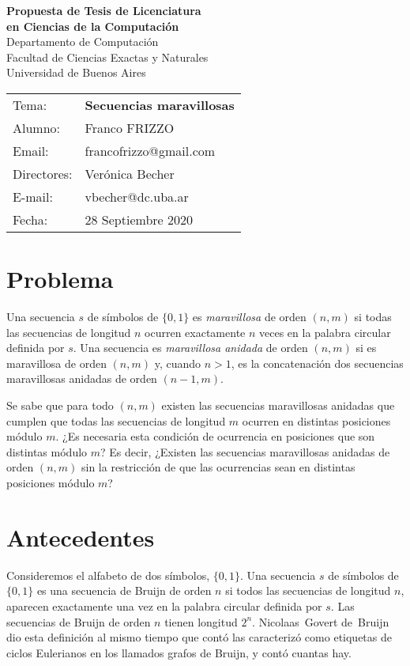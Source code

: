 \documentclass[a4paper,11pt]{article}
\begin{document}
\newtheorem*{problema}{Problema}

\begin{center}

{\Large\bf Propuesta de Tesis de Licenciatura\\
 en Ciencias de la Computación}
\medskip
\\
Departamento de Computaci\'on\\
 Facultad de Ciencias Exactas y Naturales\\
Universidad de Buenos Aires
\end{center}
\bigskip

\noindent
\begin{tabular}{ll}
Tema:   &{\large \bf Secuencias maravillosas}\\
Alumno: &Franco FRIZZO\\
Email:  &francofrizzo@gmail.com\\
Directores:&  Ver\'onica Becher \\
E-mail: &vbecher@dc.uba.ar \\
Fecha:& 28 Septiembre   2020\\
\end{tabular}
\bigskip


\section*{\bf Problema}
Una secuencia $s$ de símbolos de $\{0,1\}$  es {\em maravillosa} de orden $(n,m)$
si todas las secuencias 
 de longitud $n$ ocurren exactamente  $n$ veces en
 la palabra circular definida por $s$.
Una  secuencia es {\em maravillosa anidada} de orden $(n,m)$
si es maravillosa  de orden $(n,m)$
y, cuando  $n>1$, es la concatenación  dos secuencias
 maravillosas  anidadas de orden $(n-1,m)$.

Se sabe que para todo $(n,m)$
 existen las secuencias maravillosas anidadas que cumplen que 
todas las secuencias de longitud $m$ ocurren en distintas posiciones módulo $m$.
¿Es necesaria esta condición de ocurrencia en posiciones 
que son distintas módulo $m$?
Es decir, ¿Existen las secuencias maravillosas anidadas de orden $(n,m)$ 
sin la restricción de que las ocurrencias
sean en distintas posiciones módulo $m$?

\section*{Antecedentes}

Consideremos el alfabeto de dos símbolos, $\{0,1\}$.
  Una secuencia $s$ de símbolos de $\{0,1\}$ es una secuencia de  Bruijn
de orden $n$ si todos las secuencias  de longitud $n$,
  aparecen exactamente una vez en la palabra circular definida por $s$.
Las secuencias de Bruijn de orden $n$ tienen longitud $2^n$.
Nicolaas~Govert de~Bruijn \cite{db} dio esta definición al mismo tiempo que contó 
las caracterizó como etiquetas de ciclos Eulerianos en los llamados grafos de Bruijn,
y contó cuantas hay.
\end{document}
